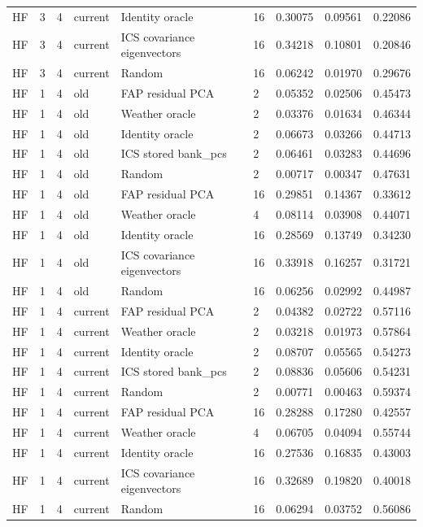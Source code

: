 \begin{tabular}{lllllllll}
HF & 3 & 4 & current & Identity oracle & 16 & 0.30075 & 0.09561 & 0.22086 \\
HF & 3 & 4 & current & ICS covariance eigenvectors & 16 & 0.34218 & 0.10801 & 0.20846 \\
HF & 3 & 4 & current & Random & 16 & 0.06242 & 0.01970 & 0.29676 \\
HF & 1 & 4 & old & FAP residual PCA & 2 & 0.05352 & 0.02506 & 0.45473 \\
HF & 1 & 4 & old & Weather oracle & 2 & 0.03376 & 0.01634 & 0.46344 \\
HF & 1 & 4 & old & Identity oracle & 2 & 0.06673 & 0.03266 & 0.44713 \\
HF & 1 & 4 & old & ICS stored bank\_pcs & 2 & 0.06461 & 0.03283 & 0.44696 \\
HF & 1 & 4 & old & Random & 2 & 0.00717 & 0.00347 & 0.47631 \\
HF & 1 & 4 & old & FAP residual PCA & 16 & 0.29851 & 0.14367 & 0.33612 \\
HF & 1 & 4 & old & Weather oracle & 4 & 0.08114 & 0.03908 & 0.44071 \\
HF & 1 & 4 & old & Identity oracle & 16 & 0.28569 & 0.13749 & 0.34230 \\
HF & 1 & 4 & old & ICS covariance eigenvectors & 16 & 0.33918 & 0.16257 & 0.31721 \\
HF & 1 & 4 & old & Random & 16 & 0.06256 & 0.02992 & 0.44987 \\
HF & 1 & 4 & current & FAP residual PCA & 2 & 0.04382 & 0.02722 & 0.57116 \\
HF & 1 & 4 & current & Weather oracle & 2 & 0.03218 & 0.01973 & 0.57864 \\
HF & 1 & 4 & current & Identity oracle & 2 & 0.08707 & 0.05565 & 0.54273 \\
HF & 1 & 4 & current & ICS stored bank\_pcs & 2 & 0.08836 & 0.05606 & 0.54231 \\
HF & 1 & 4 & current & Random & 2 & 0.00771 & 0.00463 & 0.59374 \\
HF & 1 & 4 & current & FAP residual PCA & 16 & 0.28288 & 0.17280 & 0.42557 \\
HF & 1 & 4 & current & Weather oracle & 4 & 0.06705 & 0.04094 & 0.55744 \\
HF & 1 & 4 & current & Identity oracle & 16 & 0.27536 & 0.16835 & 0.43003 \\
HF & 1 & 4 & current & ICS covariance eigenvectors & 16 & 0.32689 & 0.19820 & 0.40018 \\
HF & 1 & 4 & current & Random & 16 & 0.06294 & 0.03752 & 0.56086 \\
\bottomrule
\end{tabular}
